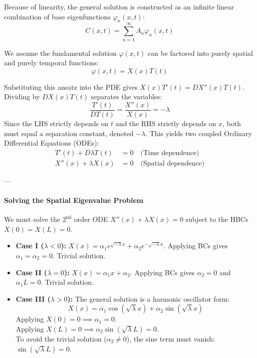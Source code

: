 Because of linearity, the general solution is constructed as an infinite linear combination of base eigenfunctions $\varphi_{n}(x,t)$:
\begin{equation}
C(x,t) = \sum_{n=1}^{\infty} A_{n} \varphi_{n}(x,t)
\end{equation}

We assume the fundamental solution $\varphi(x,t)$ can be factored into purely spatial and purely temporal functions:
\begin{equation}
\varphi(x,t) = X(x)T(t)
\end{equation}

Substituting this ansatz into the PDE gives $X(x)T'(t) = D X''(x)T(t)$. Dividing by $D X(x)T(t)$ separates the variables:
\[
\frac{T'(t)}{D T(t)} = \frac{X''(x)}{X(x)} = -\lambda
\]
Since the LHS strictly depends on $t$ and the RHS strictly depends on $x$, both must equal a separation constant, denoted $-\lambda$. This yields two coupled Ordinary Differential Equations (ODEs):
\begin{align}
T'(t) + D\lambda T(t) &= 0 \quad \text{(Time dependence)} \\
X''(x) + \lambda X(x) &= 0 \quad \text{(Spatial dependence)}
\end{align}

---

\paragraph{Solving the Spatial Eigenvalue Problem}
We must solve the $2^{\text{nd}}$ order ODE $X''(x) + \lambda X(x) = 0$ subject to the HBCs $X(0) = X(L) = 0$.

\begin{itemize}
    \item \textbf{Case I ($\lambda < 0$):} $X(x) = \alpha_{1}e^{\sqrt{-\lambda}x} + \alpha_{2}e^{-\sqrt{-\lambda}x}$. Applying BCs gives $\alpha_1 = \alpha_2 = 0$. Trivial solution.
    \item \textbf{Case II ($\lambda = 0$):} $X(x) = \alpha_{1}x + \alpha_{2}$. Applying BCs gives $\alpha_2=0$ and $\alpha_1 L = 0$. Trivial solution.
    \item \textbf{Case III ($\lambda > 0$):} The general solution is a harmonic oscillator form:
    \[
    X(x) = \alpha_{1}\cos(\sqrt{\lambda}x) + \alpha_{2}\sin(\sqrt{\lambda}x)
    \]
    Applying $X(0) = 0 \implies \alpha_{1} = 0$. \\
    Applying $X(L) = 0 \implies \alpha_{2}\sin(\sqrt{\lambda}L) = 0$. \\
    To avoid the trivial solution ($\alpha_{2} \neq 0$), the sine term must vanish: $\sin(\sqrt{\lambda}L) = 0$.
\end{itemize}

